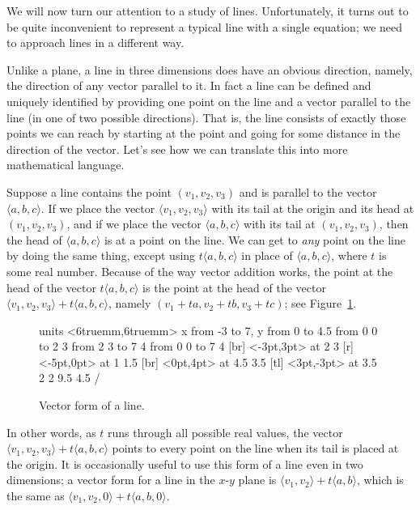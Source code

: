 We will now turn our attention to a study of lines. Unfortunately, it turns out to be quite inconvenient to
represent a typical line with a single equation; we need to approach
lines in a different way.

Unlike a plane, a line in three dimensions does have an obvious
direction, namely, the direction of any vector parallel to it. In fact
a line can be defined and uniquely identified by providing one point
on the line and a vector parallel to the line (in one of two possible
directions). That is, the line consists of exactly those points we can
reach by starting at the point and going for some distance in the
direction of the vector. Let's see how we can translate this into more
mathematical language. 

Suppose a line contains the point $(v_1,v_2,v_3)$ and is parallel
to the vector $\langle a,b,c\rangle$. If we place the vector
$\langle v_1,v_2,v_3\rangle$ with its tail at the origin and its head
at $(v_1,v_2,v_3)$, and if we place the vector $\langle
a,b,c\rangle$ with its tail at $(v_1,v_2,v_3)$, then the head of
$\langle a,b,c\rangle$ is at a point on the line. We can get to
\emph{any} point on the line by doing the same thing, except using
$t\langle a,b,c\rangle$ in place of $\langle a,b,c\rangle$, where $t$
is some real number. Because of the way vector addition works, the
point at the head of the vector $t\langle a,b,c\rangle$ is the point
at the head of the vector $\langle v_1,v_2,v_3\rangle+t\langle
a,b,c\rangle$, namely $(v_1+ta,v_2+tb,v_3+tc)$; see
Figure~\ref{fig:vector line}.

\begin{figure}[H]
\centerline{
\vbox{\beginpicture
\normalgraphs
\setcoordinatesystem units <6truemm,6truemm>
\setplotarea x from -3 to 7, y from 0 to 4.5
\arrow <4pt> [0.35, 1] from 0 0 to 2 3
\arrow <4pt> [0.35, 1] from 2 3 to 7 4
\arrow <4pt> [0.35, 1] from 0 0 to 7 4
 [br] <-3pt,3pt> at 2 3
 [r] <-5pt,0pt> at 1 1.5
 [br] <0pt,4pt> at 4.5 3.5
 [tl]
  <3pt,-3pt> at 3.5 2
\setdashes
{} 2 9.5 4.5 /
\endpicture}}
\caption{Vector form of a line. \label{fig:vector line}}
\end{figure}

In other words, as $t$ runs through all possible real values, the
vector $\langle v_1,v_2,v_3\rangle+t\langle a,b,c\rangle$ points to
every point on the line when its tail is placed at the origin. It is occasionally useful to use this form of a line even in two
dimensions; a vector form for a line in the $x$-$y$ plane is
$\langle v_1,v_2\rangle+t\langle a,b\rangle$, which is the same as
$\langle v_1,v_2,0\rangle+t\langle a,b,0\rangle$.

